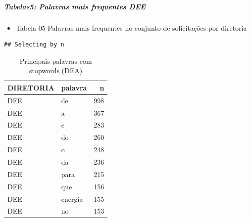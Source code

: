 \documentclass[]{article}
\newenvironment{Shaded}{\begin{snugshade}}{\end{snugshade}}
\newcommand{\KeywordTok}[1]{\textcolor[rgb]{0.13,0.29,0.53}{\textbf{#1}}}
\newcommand{\DataTypeTok}[1]{\textcolor[rgb]{0.13,0.29,0.53}{#1}}
\newcommand{\DecValTok}[1]{\textcolor[rgb]{0.00,0.00,0.81}{#1}}
\newcommand{\StringTok}[1]{\textcolor[rgb]{0.31,0.60,0.02}{#1}}
\newcommand{\OperatorTok}[1]{\textcolor[rgb]{0.81,0.36,0.00}{\textbf{#1}}}
\newcommand{\NormalTok}[1]{#1}
\providecommand{\tightlist}{%
  \setlength{\itemsep}{0pt}\setlength{\parskip}{0pt}}
\let\oldsubparagraph\subparagraph
\renewcommand{\subparagraph}[1]{\oldsubparagraph{#1}\mbox{}}
\begin{document}
\subparagraph{Tabelas5: Palavras mais frequentes
DEE}\label{tabelas5-palavras-mais-frequentes-dee}

\begin{itemize}
\tightlist
\item
  Tabela 05 Palavras mais frequentes no conjunto de solicitações por
  diretoria
\end{itemize}

\begin{Shaded}
\end{Shaded}

\begin{verbatim}
## Selecting by n
\end{verbatim}

\begin{table}[!h]

\caption{\label{tab:unnamed-chunk-23}Principais palavras com stopwords (DEA)}
\centering
\begin{tabular}{llr}
\toprule
DIRETORIA & palavra & n\\
\midrule
\rowcolor{gray!6}  DEE & de & 998\\
DEE & a & 367\\
\rowcolor{gray!6}  DEE & e & 283\\
DEE & do & 260\\
\rowcolor{gray!6}  DEE & o & 248\\
\addlinespace
DEE & da & 236\\
\rowcolor{gray!6}  DEE & para & 215\\
DEE & que & 156\\
\rowcolor{gray!6}  DEE & energia & 155\\
DEE & no & 153\\
\bottomrule
\end{tabular}
\end{table}
\end{document}
